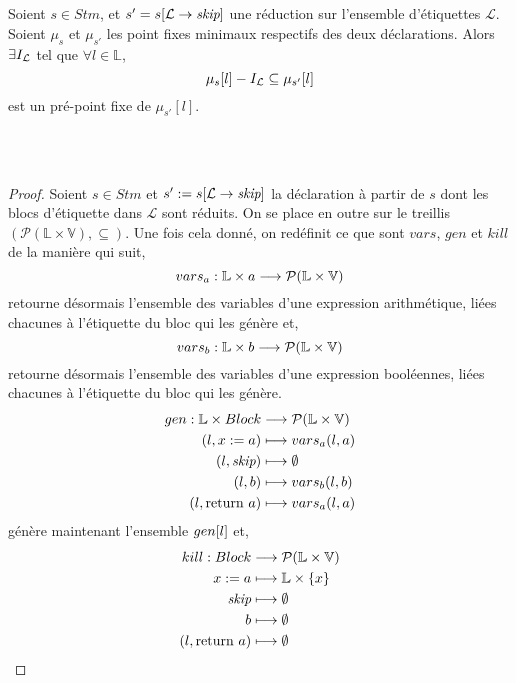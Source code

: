 \documentclass[a4paper, 10pt]{article}
\begin{document}
\\
\\
\begin{theorem}
	Soient $s \in Stm$, et $s' = s[\mathcal{L} \rightarrow{ \textit{skip} }]$ une réduction sur
	l'ensemble d'étiquettes $\mathcal{L}$. Soient $\mu_s$ et $\mu_{s'}$ les point fixes minimaux respectifs
	des deux déclarations.
	Alors $\exists I_{\mathcal{L}}$ tel que $\forall l \in \mathbb{L}$,
	\[
		\mu_s[l] - I_{\mathcal{L}} \subseteq \mu_{s'}[l]
	\]
	est un pré-point fixe de $\mu_{s'}[l]$.
\end{theorem}
\\
\\
\begin{proof}
	Soient $s \in Stm$ et $s' := s[\mathcal{L} \rightarrow{ \textit{skip} }]$ la déclaration à partir de $s$ dont les blocs d'étiquette 
	dans $\mathcal{L}$ sont réduits. 
	On se place en outre sur le treillis $(\mathcal{P}(\mathbb{L} \times \mathbb{V}), \subseteq)$. 
	Une fois cela donné, on redéfinit ce que sont $vars$, $gen$ et $kill$ de la manière qui suit, 
	\[vars_a : \mathbb{L} \times a \longrightarrow \mathcal{P}(\mathbb{L} \times \mathbb{V})\]
	retourne désormais l'ensemble des variables d'une expression arithmétique, liées chacunes à l'étiquette du bloc qui les génère et,
	\[vars_b : \mathbb{L} \times b \longrightarrow \mathcal{P}(\mathbb{L} \times \mathbb{V})\]
	retourne désormais l'ensemble des variables d'une expression booléennes, liées chacunes à l'étiquette du bloc qui les génère.
	\begin{align*}
		gen : \mathbb{L} \times Block &\longrightarrow \mathcal{P}(\mathbb{L} \times \mathbb{V})\\
		(l, {x}\space:=\space{a}) &\longmapsto vars_a(l, a)\\
		(l, \textit{skip}) &\longmapsto \emptyset\\
		(l, b) &\longmapsto vars_b(l, b)\\
		(l, \text{return }{a}) &\longmapsto vars_a(l, a)
	\end{align*}
	génère maintenant l'ensemble $gen[l]$ et,
	\begin{align*}
		kill : Block &\longrightarrow \mathcal{P}(\mathbb{L} \times \mathbb{V})\\
		{x}\space:=\space{a} &\longmapsto \mathbb{L} \times \{x\}\\
		\textit{skip} &\longmapsto \emptyset\\
		b &\longmapsto \emptyset\\
		(l, \text{return }{a}) &\longmapsto \emptyset
	\end{align*}

\end{proof}
\end{document}
